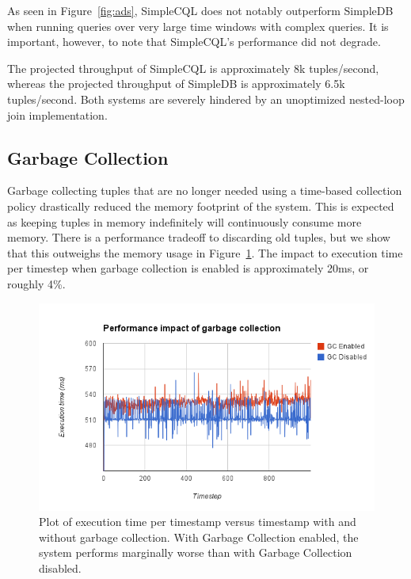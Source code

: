 \documentclass[a4paper, 10pt, conference]{IEEEconf}
\begin{document}
As seen in Figure~\ref{fig:ads}, SimpleCQL does not notably outperform SimpleDB when running queries over very large time windows with complex queries.  It is important, however, to note that SimpleCQL's performance did not degrade.

The projected throughput of SimpleCQL is approximately 8k tuples/second, whereas the projected throughput of SimpleDB is approximately 6.5k tuples/second.  Both systems are severely hindered by an unoptimized nested-loop join implementation.

\subsection{Garbage Collection}
Garbage collecting tuples that are no longer needed using a time-based collection policy drastically reduced the memory footprint of the system.  This is expected as keeping tuples in memory indefinitely will continuously consume more memory.  There is a performance tradeoff to discarding old tuples, but we show that this outweighs the memory usage in Figure~\ref{fig:gc_perf}.  The impact to execution time per timestep when garbage collection is enabled is approximately 20ms, or roughly 4\%.

\begin{figure}[h!]
    \centering
    \centerline{\includegraphics[totalheight=5cm]{gc_perf.png}}
    \caption{Plot of execution time per timestamp versus timestamp with and without garbage collection. With Garbage Collection enabled, the system performs marginally worse than with Garbage Collection disabled.}
    \label{fig:gc_perf}
\end{figure}

\end{document}
